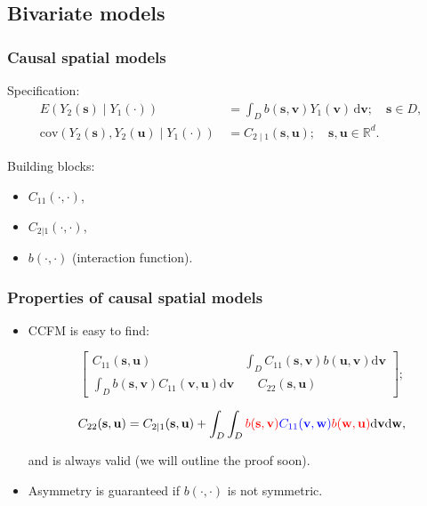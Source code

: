 \documentclass{beamer}
\newcommand{\s}{\mathbf{s}}
\renewcommand{\v}{\mathbf{v}}
\renewcommand{\u}{\mathbf{u}}
\newcommand{\w}{\mathbf{w}}
\renewcommand{\d}{\mathrm{d}}
\newcommand{\E}{E}
\newcommand{\cov}{\mathrm{cov}}
\newcommand{\red}{\textcolor{red}}%
\newcommand{\blue}{\textcolor{blue}}
\begin{document}
\subsection{Bivariate models}

\begin{frame}
\frametitle{Causal spatial models}

Specification:
\begin{align}\label{eqn:E-and-cov}                                                          
\E\left(Y_2(\s)\mid Y_1(\cdot)\right)&\,=\int_D{b(\s,\v)Y_1(\v)\,\d \v};\quad \s\in D,\\
\cov\left(Y_2(\s),Y_2(\u)\mid Y_1(\cdot)\right)&\,=C_{2\mid 1}(\s,\u);\quad \s,\u\in \mathbb{R}^d.\end{align}  

Building blocks:
\begin{itemize}
\item $C_{11}(\cdot,\cdot)$,
\item $C_{2|1}(\cdot,\cdot)$,
\item $b(\cdot,\cdot)$ (interaction function).
\end{itemize}
\end{frame}


\begin{frame}
\frametitle{Properties of causal spatial models}

\begin{itemize}
\item  CCFM is easy to find:

\begin{equation}
\begin{bmatrix} C_{11}(\s,\u) & \int_DC_{11}(\s,\v)b(\u,\v)\d\v \\ \int_Db(\s,\v)C_{11}(\v,\u)\d\v & ~~~~~C_{22}(\s,\u)\end{bmatrix};                     
\end{equation}

\begin{equation}
\small
C_{22}(\s,\u) = C_{2\mid 1}(\s,\u)+\int_D\int_D \red{b(\s,\v)} \blue{C_{11}(\v,\w)} \red{b(\w,\u)}\d\v\d\w,
\end{equation}

and is always valid (we will outline the proof soon). \vfill

\item Asymmetry is guaranteed if $b(\cdot,\cdot)$ is not symmetric. \vfill
\end{itemize}
\end{frame}
\end{document}
